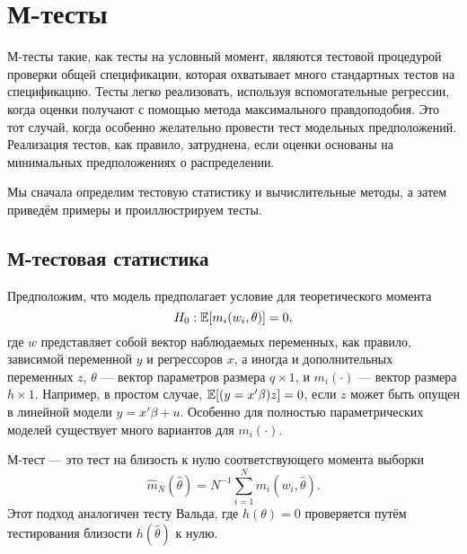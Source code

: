 \section{М-тесты}

М-тесты такие, как тесты на условный момент, являются тестовой процедурой проверки общей спецификации, которая охватывает много стандартных тестов на спецификацию. Тесты легко реализовать, используя вспомогательные регрессии, когда оценки получают с помощью метода максимального правдоподобия. Это тот случай, когда особенно желательно провести тест модельных предположений. Реализация тестов, как правило, затруднена, если оценки основаны на минимальных предположениях о распределении.

Мы сначала определим тестовую статистику и вычислительные методы, а затем приведём примеры и проиллюстрируем тесты.

\subsection{М-тестовая статистика}

Предположим, что модель предполагает условие для теоретического момента
\begin{equation}
H_0: \mathbb{E}[m_i(w_i, \theta)] = 0,
\end{equation}
где $w$ представляет собой вектор наблюдаемых переменных, как правило, зависимой переменной $y$ и регрессоров $x$, а иногда и дополнительных переменных $z$, $\theta$ --- вектор параметров размера $q \times 1$, и $m_i(\cdot)$ --- вектор размера $h \times 1$. Например, в простом случае, $\mathbb{E}[(y = x'\beta)z] = 0$, если $z$ может быть опущен в линейной модели $y = x'\beta + u$. Особенно для полностью параметрических моделей существует много вариантов для $m_i(\cdot)$.

М-тест --- это тест на близость к нулю соответствующего момента выборки 
\begin{equation}
\hat{m}_N (\hat{\theta}) = N^{-1} \sum_{i=1}^N m_i(w_i, \hat{\theta}).
\end{equation}
Этот подход аналогичен тесту Вальда, где $h(\theta) = 0$ проверяется путём тестирования близости $h(\hat{\theta})$ к нулю.

